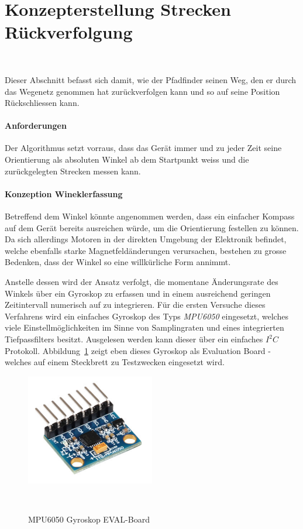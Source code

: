 \documentclass[main.tex]{subfiles} %
\begin{document}

\section{Konzepterstellung Strecken Rückverfolgung}~\label{appendix:Strecke_Tracken}

Dieser Abschnitt befasst sich damit, wie der Pfadfinder seinen Weg, den er
durch das Wegenetz genommen hat zurückverfolgen kann und so auf seine Position
Rückschliessen kann.

\paragraph{Anforderungen}
Der Algorithmus setzt vorraus, dass das Gerät immer und zu jeder Zeit seine
Orientierung als absoluten Winkel ab dem Startpunkt weiss und die
zurückgelegten Strecken messen kann.

\paragraph{Konzeption Wineklerfassung}
Betreffend dem Winkel könnte angenommen werden, dass ein einfacher Kompass auf
dem Gerät bereits ausreichen würde, um die Orientierung festellen zu können. Da
sich allerdings Motoren in der direkten Umgebung der Elektronik befindet,
welche ebenfalls starke Magnetfeldänderungen verursachen, bestehen zu grosse
Bedenken, dass der Winkel so eine willkürliche Form annimmt.

Anstelle dessen wird der Ansatz verfolgt, die momentane Änderungsrate des
Winkels über ein Gyroskop zu erfassen und in einem ausreichend geringen
Zeitintervall numerisch auf zu integrieren. Für die ersten Versuche dieses
Verfahrens wird ein einfaches Gyroskop des Typs \textit{MPU6050} eingesetzt,
welches viele Einstellmöglichkeiten im Sinne von Samplingraten und eines
integrierten Tiefpassfilters besitzt. Ausgelesen werden kann dieser über ein
einfaches $I^2C$ Protokoll. Abbildung~\ref{fig:MPU6050} zeigt eben dieses
Gyroskop als Evaluation Board - welches auf einem Steckbrett zu Testzwecken
eingesetzt wird.

\begin{figure}[h!]
    \centering
    \includegraphics[width=0.5\textwidth]{./fig_Strecken_Tracken/MPU6050.png}
    \caption{MPU6050 Gyroskop EVAL-Board}~\label{fig:MPU6050}
\end{figure}
\end{document}
